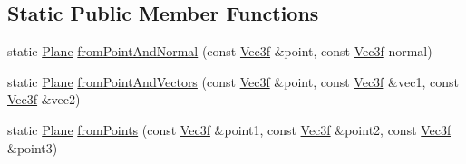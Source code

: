 \subsection*{Static Public Member Functions}
\begin{DoxyCompactItemize}
\item 
static \hyperlink{class_plane}{Plane} \hyperlink{class_plane_a383c0b4578ecc7776797553dbd615409}{from\+Point\+And\+Normal} (const \hyperlink{class_vec3f}{Vec3f} \&point, const \hyperlink{class_vec3f}{Vec3f} normal)
\item 
static \hyperlink{class_plane}{Plane} \hyperlink{class_plane_a65718dd8b39d7e06bcea656196e1d0f3}{from\+Point\+And\+Vectors} (const \hyperlink{class_vec3f}{Vec3f} \&point, const \hyperlink{class_vec3f}{Vec3f} \&vec1, const \hyperlink{class_vec3f}{Vec3f} \&vec2)
\item 
static \hyperlink{class_plane}{Plane} \hyperlink{class_plane_ab97792a6e6d912598945943c3d5468c4}{from\+Points} (const \hyperlink{class_vec3f}{Vec3f} \&point1, const \hyperlink{class_vec3f}{Vec3f} \&point2, const \hyperlink{class_vec3f}{Vec3f} \&point3)
\end{DoxyCompactItemize}



